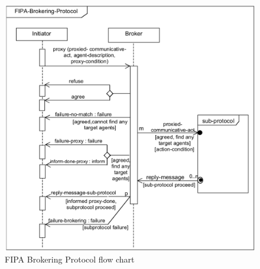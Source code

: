 \begin{figure}\centering
	\includegraphics[width=0.66\linewidth]{_appendices/_a2/fig/fipa-brokering}
	\caption{FIPA Brokering Protocol flow chart}
	\label{appx-b:fig:fipa-brokering}
\end{figure}